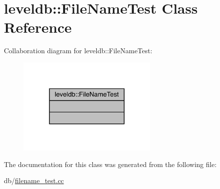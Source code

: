 \hypertarget{classleveldb_1_1_file_name_test}{}\section{leveldb\+::File\+Name\+Test Class Reference}
\label{classleveldb_1_1_file_name_test}


Collaboration diagram for leveldb\+::File\+Name\+Test\+:
\nopagebreak
\begin{figure}[H]
\begin{center}
\leavevmode
\includegraphics[width=194pt]{classleveldb_1_1_file_name_test__coll__graph}
\end{center}
\end{figure}


The documentation for this class was generated from the following file\+:\begin{DoxyCompactItemize}
\item 
db/\mbox{\hyperlink{filename__test_8cc}{filename\+\_\+test.\+cc}}\end{DoxyCompactItemize}
